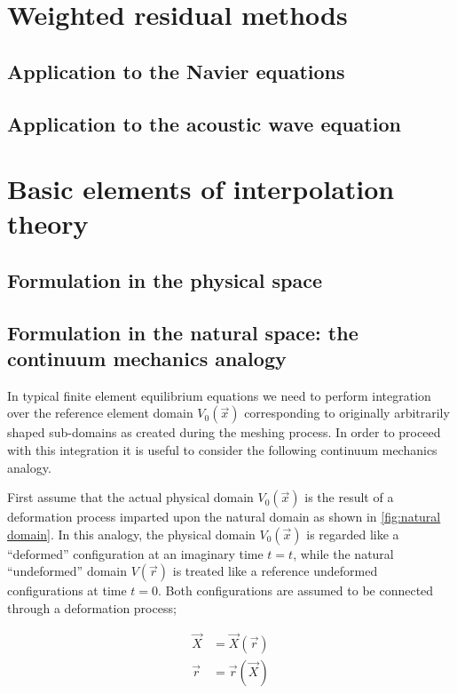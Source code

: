 \section{Weighted residual methods}
\subsection{Application to the Navier equations}
\subsection{Application to the acoustic wave equation}

\section{Basic elements of interpolation theory}
\subsection{Formulation in the physical space}
\subsection{Formulation in the natural space: the continuum mechanics analogy}
In typical finite element equilibrium equations we need to perform integration over the reference element domain $V_0(\vec{x})$ corresponding to originally arbitrarily shaped sub-domains as created during the meshing process.  In order to proceed with this integration it is useful to consider the following continuum mechanics analogy.

First assume that the actual physical domain $V_0(\vec{x})$ is the result of a deformation process imparted upon the natural domain as shown in \cref{fig:natural domain}. In this analogy, the physical domain $V_0(\vec{x})$ is regarded like a ``deformed'' configuration at an imaginary time $t=t$, while the natural ``undeformed'' domain $V(\vec{r})$   is treated like a reference undeformed configurations at time $t=0$. Both configurations are assumed to be connected through a deformation process;


\begin{equation}
\begin{aligned}
\vec{X}&=\vec{X}(\vec{r})\\
\vec{r}&=\vec{r}(\vec{X})
\end{aligned}
\label{eq:motion}
\end{equation}

